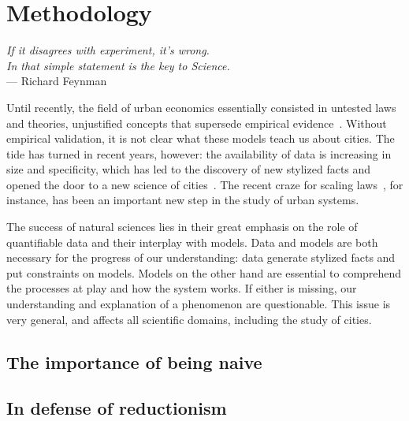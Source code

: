 

\chapter{Methodology}
\label{chap:methodology}

\begin{flushright}{\slshape    
If it disagrees with experiment, it's wrong.\\ 
In that simple statement is the key to Science.} \\ \medskip
--- Richard Feynman~\cite{Feynman:1965}
\end{flushright}


\bigskip


Until recently, the field of urban economics essentially consisted in untested
laws and theories, unjustified concepts that supersede empirical
evidence~\cite{Bouchaud:2008}. Without empirical validation, it is not clear
what these models teach us about cities. The tide has turned in recent years,
however: the availability of data is increasing in size and specificity, which
has led to the discovery of new stylized facts and opened the door to a new
science of cities~\cite{Batty:2013}. The recent craze for scaling
laws~\cite{Batty:2008,Bettencourt:2007,Pumain:2004}, for instance, has been an
important new step in the study of urban systems.

The success of natural sciences lies in their great emphasis on the role of
quantifiable data and their interplay with models. Data and models are both
necessary for the progress of our understanding: data generate stylized facts
and put constraints on models. Models on the other hand are essential to
comprehend the processes at play and how the system works. If either is missing,
our understanding and explanation of a phenomenon are questionable. This issue
is very general, and affects all scientific domains, including the study of
cities. \\
\section{The importance of being naive}
\label{sec:the_importance_of_being_naive}

\section{In defense of reductionism}
\label{sec:in_defense_of_reductionism}

